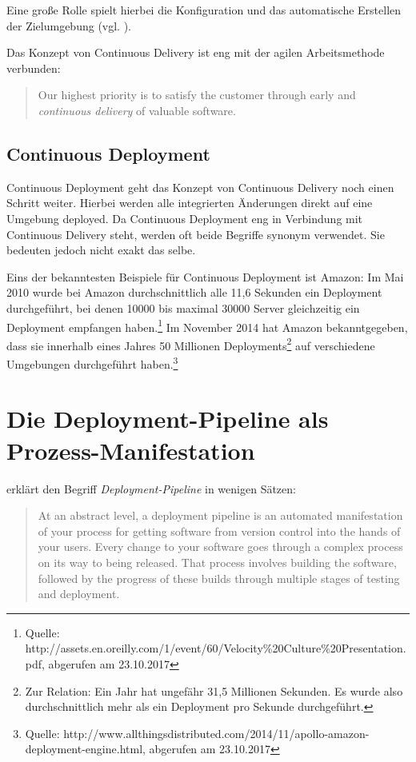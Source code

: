Eine große Rolle spielt hierbei die Konfiguration und das automatische Erstellen der Zielumgebung (vgl. ).

Das Konzept von Continuous Delivery ist eng mit der agilen Arbeitsmethode \citep{AgileManifesto} verbunden:

\begin{quote}
  Our highest priority is to satisfy the customer through early and \emph{continuous delivery} of valuable software.
\end{quote}

\subsection{Continuous Deployment}

Continuous Deployment geht das Konzept von Continuous Delivery noch einen Schritt weiter. Hierbei werden alle integrierten Änderungen direkt auf eine Umgebung deployed. Da Continuous Deployment eng in Verbindung mit Continuous Delivery steht, werden oft beide Begriffe synonym verwendet. Sie bedeuten jedoch nicht exakt das selbe. \citep{FowlerCD}

Eins der bekanntesten Beispiele für Continuous Deployment ist Amazon: Im Mai 2010 wurde bei Amazon durchschnittlich alle 11,6 Sekunden ein Deployment durchgeführt, bei denen 10000 bis maximal 30000 Server gleichzeitig ein Deployment empfangen haben.\footnote{Quelle: http://assets.en.oreilly.com/1/event/60/Velocity\%20Culture\%20Presentation.pdf, abgerufen am 23.10.2017} Im November 2014 hat Amazon bekanntgegeben, dass sie innerhalb eines Jahres 50 Millionen Deployments\footnote{Zur Relation: Ein Jahr hat ungefähr 31,5 Millionen Sekunden. Es wurde also durchschnittlich mehr als ein Deployment pro Sekunde durchgeführt.} auf verschiedene Umgebungen durchgeführt haben.\footnote{Quelle: http://www.allthingsdistributed.com/2014/11/apollo-amazon-deployment-engine.html, abgerufen am 23.10.2017}

\section{Die Deployment-Pipeline als Prozess-Manifestation}
\label{sec:deployment-pipeline}

\citet[106]{Humble2010} erklärt den Begriff \emph{Deployment-Pipeline} in wenigen Sätzen:

\begin{quote}
 At an abstract level, a deployment pipeline is an automated manifestation of your process for getting software from version control into the hands of your users. Every change to your software goes through a complex process on its way to being released. That process involves building the software, followed by the progress of these builds through multiple stages of testing and deployment.
\end{quote}

